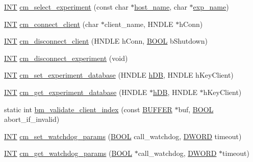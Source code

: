 \begin{DoxyCompactItemize}
\item 
\hyperlink{vppg_8h_a392e62da233ed3e2f7c3fd4f487a3896}{INT} \hyperlink{group__cmfunctionc_ga5b4ff6bff1fa714ea4697e317d39ea0f}{cm\_\-select\_\-experiment} (const char $\ast$\hyperlink{mevb_8c_af65cc3664520b7cd0817adc7106f9624}{host\_\-name}, char $\ast$\hyperlink{mfe_8c_a11eee1a5e2cef985b90bdfe0bfc8cf76}{exp\_\-name})
\item 
\hyperlink{vppg_8h_a392e62da233ed3e2f7c3fd4f487a3896}{INT} \hyperlink{group__cmfunctionc_ga6a8a21234c7ce94bdf26bbcbcf778a39}{cm\_\-connect\_\-client} (char $\ast$client\_\-name, HNDLE $\ast$hConn)
\item 
\hyperlink{vppg_8h_a392e62da233ed3e2f7c3fd4f487a3896}{INT} \hyperlink{group__cmfunctionc_ga084b807db46901ac411824a94f59645d}{cm\_\-disconnect\_\-client} (HNDLE hConn, \hyperlink{vt2_8h_a239c7f0d40651c3e419c5b9651507d14}{BOOL} bShutdown)
\item 
\hyperlink{vppg_8h_a392e62da233ed3e2f7c3fd4f487a3896}{INT} \hyperlink{group__cmfunctionc_ga7d5a287821786e8dde3d2340826215b2}{cm\_\-disconnect\_\-experiment} (void)
\item 
\hyperlink{vppg_8h_a392e62da233ed3e2f7c3fd4f487a3896}{INT} \hyperlink{group__cmfunctionc_gadf088255bf3e91f3efe83c7e5f0cd733}{cm\_\-set\_\-experiment\_\-database} (HNDLE \hyperlink{mevb_8c_ab1f60c53f74e806a3b9f687af38d7421}{hDB}, HNDLE hKeyClient)
\item 
\hyperlink{vppg_8h_a392e62da233ed3e2f7c3fd4f487a3896}{INT} \hyperlink{group__cmfunctionc_ga16b33b70783a3f5ba98b4094149d12b7}{cm\_\-get\_\-experiment\_\-database} (HNDLE $\ast$\hyperlink{mevb_8c_ab1f60c53f74e806a3b9f687af38d7421}{hDB}, HNDLE $\ast$hKeyClient)
\item 
static int \hyperlink{group__cmfunctionc_gab85c5c492c0ebadafe7b08fde9a4e946}{bm\_\-validate\_\-client\_\-index} (const \hyperlink{structBUFFER}{BUFFER} $\ast$buf, \hyperlink{vt2_8h_a239c7f0d40651c3e419c5b9651507d14}{BOOL} abort\_\-if\_\-invalid)
\item 
\hyperlink{vppg_8h_a392e62da233ed3e2f7c3fd4f487a3896}{INT} \hyperlink{group__cmfunctionc_gaf98a4288e4c02da7c75f3e0326ff0e72}{cm\_\-set\_\-watchdog\_\-params} (\hyperlink{vt2_8h_a239c7f0d40651c3e419c5b9651507d14}{BOOL} call\_\-watchdog, \hyperlink{vt2_8h_a798af1e30bc65f319c1a246cecf59e39}{DWORD} timeout)
\item 
\hyperlink{vppg_8h_a392e62da233ed3e2f7c3fd4f487a3896}{INT} \hyperlink{group__cmfunctionc_ga1873a038ab84d2f812f92c02fed97eea}{cm\_\-get\_\-watchdog\_\-params} (\hyperlink{vt2_8h_a239c7f0d40651c3e419c5b9651507d14}{BOOL} $\ast$call\_\-watchdog, \hyperlink{vt2_8h_a798af1e30bc65f319c1a246cecf59e39}{DWORD} $\ast$timeout)

\end{DoxyCompactItemize}
